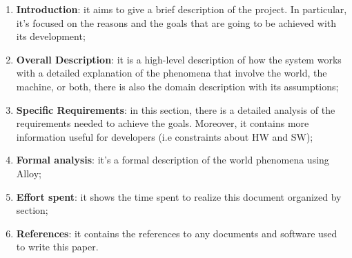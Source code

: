 \begin{enumerate}
    \item  \textbf{Introduction}: it aims to give a brief description of the project. In particular, it’s focused on the reasons and the goals that are going to be achieved with its development;
 
    \item \textbf{Overall Description}: it is a high-level description of how the system works with a detailed explanation of the phenomena that involve the world, the machine, or both, there is also the domain description with its assumptions;
 
    \item \textbf{Specific Requirements}: in this section, there is a detailed analysis of the requirements needed to achieve the goals. Moreover, it contains more information useful for developers (i.e constraints about HW and SW);
    
    \item \textbf{Formal analysis}: it’s a formal description of the world phenomena using Alloy;

    \item  \textbf{Effort spent}: it shows the time spent to realize this document organized by section;

    \item  \textbf{References}: it contains the references to any documents and software used to write this paper.
    
\end{enumerate}
